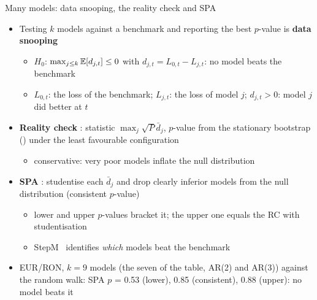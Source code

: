 \begin{frame}{Many models: data snooping, the reality check and SPA}
\itemsize{\small}
\begin{itemize}
    \item Testing $k$ models against a benchmark and reporting the best $p$-value is \textbf{data snooping}
    \begin{itemize}
        \item $H_0$: $\max_{j \le k}\mathbb{E}[d_{j,t}] \le 0$ with $d_{j,t} = L_{0,t} - L_{j,t}$: no model beats the benchmark
        \item $L_{0,t}$: the loss of the benchmark; $L_{j,t}$: the loss of model $j$; $d_{j,t} > 0$: model $j$ did better at $t$
    \end{itemize}
    \item \textbf{Reality check} : statistic $\max_j\sqrt P\bar d_j$, $p$-value from the stationary bootstrap () under the least favourable configuration
    \begin{itemize}
        \item conservative: very poor models inflate the null distribution
    \end{itemize}
    \item \textbf{SPA} : studentise each $\bar d_j$ and drop clearly inferior models from the null distribution (consistent $p$-value)
    \begin{itemize}
        \item lower and upper $p$-values bracket it; the upper one equals the RC with studentisation
        \item StepM \ identifies \emph{which} models beat the benchmark
    \end{itemize}
    \item EUR/RON, $k = 9$ models (the seven of the table, AR(2) and AR(3)) against the random walk: SPA $p$ = 0.53 (lower), 0.85 (consistent), 0.88 (upper): no model beats it
\end{itemize}
\end{frame}

